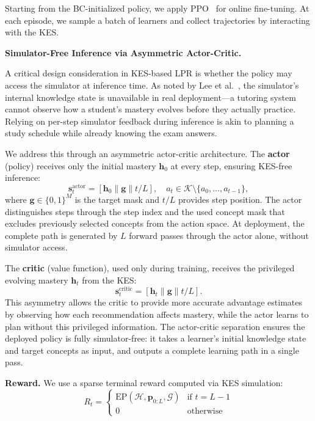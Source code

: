 \documentclass[sigconf,anonymous]{acmart}
\newcommand{\ep}{\mathrm{EP}}
\begin{document}
Starting from the BC-initialized policy, we apply PPO~\cite{schulman2017ppo} for online fine-tuning. At each episode, we sample a batch of learners and collect trajectories by interacting with the KES.

\textbf{Simulator-Free Inference via Asymmetric Actor-Critic.}

A critical design consideration in KES-based LPR is whether the policy may access the simulator at inference time. As noted by Lee et al.~\cite{li2024privileged}, the simulator's internal knowledge state is unavailable in real deployment---a tutoring system cannot observe how a student's mastery evolves before they actually practice. Relying on per-step simulator feedback during inference is akin to planning a study schedule while already knowing the exam answers.

We address this through an asymmetric actor-critic architecture. The \textbf{actor} (policy) receives only the initial mastery $\mathbf{h}_0$ at every step, ensuring KES-free inference:
\begin{equation}
    \mathbf{s}_t^{\text{actor}} = [\mathbf{h}_0 \| \mathbf{g} \| t/L], \quad a_t \in \mathcal{K} \setminus \{a_0, \ldots, a_{t-1}\},
\end{equation}
where $\mathbf{g} \in \{0,1\}^M$ is the target mask and $t/L$ provides step position. The actor distinguishes steps through the step index and the used concept mask that excludes previously selected concepts from the action space. At deployment, the complete path is generated by $L$ forward passes through the actor alone, without simulator access.

The \textbf{critic} (value function), used only during training, receives the privileged evolving mastery $\mathbf{h}_t$ from the KES:
\begin{equation}
    \mathbf{s}_t^{\text{critic}} = [\mathbf{h}_t \| \mathbf{g} \| t/L].
\end{equation}
This asymmetry allows the critic to provide more accurate advantage estimates by observing how each recommendation affects mastery, while the actor learns to plan without this privileged information. The actor-critic separation ensures the deployed policy is fully simulator-free: it takes a learner's initial knowledge state and target concepts as input, and outputs a complete learning path in a single pass.

\textbf{Reward.} We use a sparse terminal reward computed via KES simulation:
\begin{equation}
    R_t = \begin{cases} \ep(\mathcal{H}, \mathbf{p}_{0:L}, \mathcal{G}) & \text{if } t = L-1 \\ 0 & \text{otherwise} \end{cases}
\end{equation}
\end{document}

